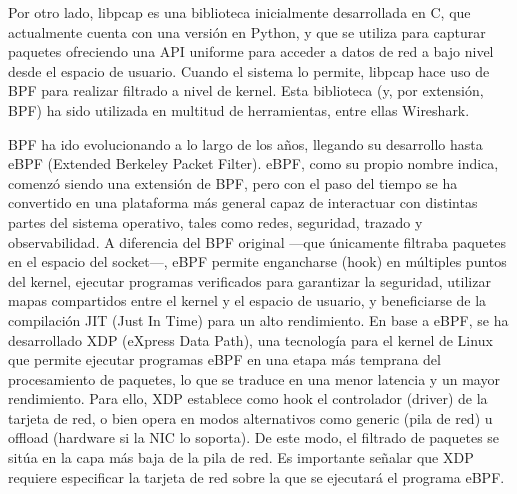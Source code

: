 Por otro lado, libpcap es una biblioteca inicialmente desarrollada en C, que actualmente cuenta con una versión en Python, y que se utiliza para capturar paquetes ofreciendo una API uniforme para acceder a datos de red a bajo nivel desde el espacio de usuario. Cuando el sistema lo permite, libpcap hace uso de BPF para realizar filtrado a nivel de kernel\cite{LibpcapDocs2025}. Esta biblioteca (y, por extensión, BPF) ha sido utilizada en multitud de herramientas, entre ellas Wireshark\cite{WiresharkLibpcapWiki}.

BPF ha ido evolucionando a lo largo de los años, llegando su desarrollo hasta eBPF (Extended Berkeley Packet Filter). eBPF, como su propio nombre indica, comenzó siendo una extensión de BPF, pero con el paso del tiempo se ha convertido en una plataforma más general capaz de interactuar con distintas partes del sistema operativo, tales como redes, seguridad, trazado y observabilidad. A diferencia del BPF original —que únicamente filtraba paquetes en el espacio del socket—, eBPF permite engancharse (hook) en múltiples puntos del kernel, ejecutar programas verificados para garantizar la seguridad, utilizar mapas compartidos entre el kernel y el espacio de usuario, y beneficiarse de la compilación JIT (Just In Time) para un alto rendimiento\cite{ebpf_website}. En base a eBPF, se ha desarrollado XDP (eXpress Data Path), una tecnología para el kernel de Linux que permite ejecutar programas eBPF en una etapa más temprana del procesamiento de paquetes, lo que se traduce en una menor latencia y un mayor rendimiento. Para ello, XDP establece como hook el controlador (driver) de la tarjeta de red, o bien opera en modos alternativos como generic (pila de red) u offload (hardware si la NIC lo soporta). De este modo, el filtrado de paquetes se sitúa en la capa más baja de la pila de red. Es importante señalar que XDP requiere especificar la tarjeta de red sobre la que se ejecutará el programa eBPF\cite{AyaXDP}.

